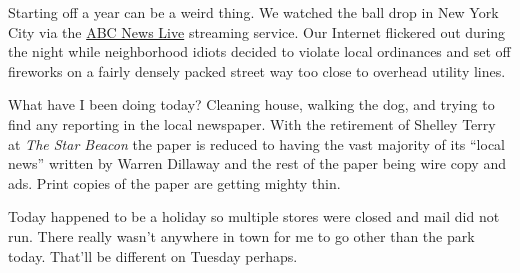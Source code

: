 Starting off a year can be a weird thing. We watched the ball drop in
New York City via the \href{https://abcnews.go.com/Live/}{ABC News Live}
streaming service. Our Internet flickered out during the night while
neighborhood idiots decided to violate local ordinances and set off
fireworks on a fairly densely packed street way too close to overhead
utility lines.

What have I been doing today? Cleaning house, walking the dog, and
trying to find any reporting in the local newspaper. With the retirement
of Shelley Terry at \emph{The Star Beacon} the paper is reduced to
having the vast majority of its ``local news'' written by Warren
Dillaway and the rest of the paper being wire copy and ads. Print copies
of the paper are getting mighty thin.

Today happened to be a holiday so multiple stores were closed and mail
did not run. There really wasn't anywhere in town for me to go other
than the park today. That'll be different on Tuesday perhaps.
